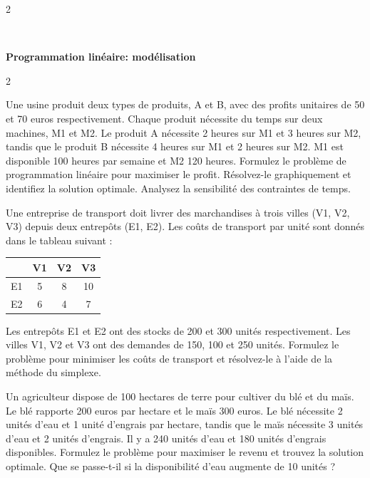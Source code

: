 \begin{multicols}{2}
\end{multicols}
\quad\\
\begin{center}
\textbf{{\large Programmation linéaire: modélisation}}
\end{center}
\begin{multicols}{2}

\begin{exo}
	Une usine produit deux types de produits, A et B, avec des profits unitaires de 50 et 70 euros respectivement. Chaque produit nécessite du temps sur deux machines, M1 et M2. Le produit A nécessite 2 heures sur M1 et 3 heures sur M2, tandis que le produit B nécessite 4 heures sur M1 et 2 heures sur M2. M1 est disponible 100 heures par semaine et M2 120 heures. Formulez le problème de programmation linéaire pour maximiser le profit. Résolvez-le graphiquement et identifiez la solution optimale. Analysez la sensibilité des contraintes de temps.
\end{exo}

\begin{exo}
	Une entreprise de transport doit livrer des marchandises à trois villes (V1, V2, V3) depuis deux entrepôts (E1, E2). Les coûts de transport par unité sont donnés dans le tableau suivant :
	\begin{center}
		\begin{tabular}{c|ccc}
			& V1 & V2 & V3 \\
			\hline
			E1 & 5 & 8 & 10 \\
			E2 & 6 & 4 & 7 \\
		\end{tabular}
	\end{center}
	Les entrepôts E1 et E2 ont des stocks de 200 et 300 unités respectivement. Les villes V1, V2 et V3 ont des demandes de 150, 100 et 250 unités. Formulez le problème pour minimiser les coûts de transport et résolvez-le à l'aide de la méthode du simplexe.
\end{exo}

\begin{exo}
	Un agriculteur dispose de 100 hectares de terre pour cultiver du blé et du maïs. Le blé rapporte 200 euros par hectare et le maïs 300 euros. Le blé nécessite 2 unités d'eau et 1 unité d'engrais par hectare, tandis que le maïs nécessite 3 unités d'eau et 2 unités d'engrais. Il y a 240 unités d'eau et 180 unités d'engrais disponibles. Formulez le problème pour maximiser le revenu et trouvez la solution optimale. Que se passe-t-il si la disponibilité d'eau augmente de 10 unités ?
\end{exo}


\end{multicols}
